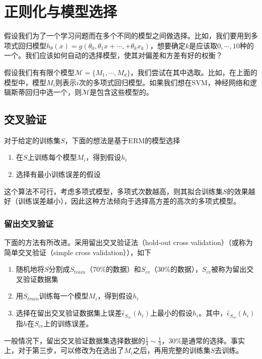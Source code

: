 \section{正则化与模型选择}
假设我们为了一个学习问题而在多个不同的模型之间做选择。比如，我们要用到多项式回归模型$h_\theta(x)=g(\theta_0,\theta_1x+\cdots,+\theta_kx_k)$，想要确定$k$是应该取$0,\cdots,10$种的一个。我们应该如何自动的选择模型，使其对偏差和方差有好的权衡？

假设我们有有限个模型$\mathcal{M}=\{M_1,\cdots,M_d\}$，我们尝试在其中选取。比如，在上面的模型中，模型$M_i$则表示$i$次的多项式回归模型。如果我们想在SVM，神经网络和逻辑斯蒂回归中选一个，则$\mathcal{M}$是包含这些模型的。

\subsection{交叉验证}
对于给定的训练集$S$，下面的想法是基于ERM的模型选择
\begin{enumerate}[1]
\item 在$S$上训练每个模型$M_i$，得到假设$h_i$
\item 选择有最小训练误差的假设
\end{enumerate}

这个算法不可行，考虑多项式模型，多项式次数越高，则其拟合训练集$S$的效果越好（训练误差越小），因此这种方法倾向于选择高方差的高次的多项式模型。
\subsubsection{留出交叉验证}
下面的方法有所改进。采用留出交叉验证法（hold-out cross validation）（或称为简单交叉验证（simple cross validation）），如下
\begin{enumerate}[1]
\item 随机地将$S$分割成$S_{train}$（$70\%$的数据）和$S_{cv}$（$30\%$的数据），$S_{cv}$被称为留出交叉验证数据集
\item 用$S_{train}$训练每一个模型$M_i$，得到假设$h_i$
\item 选择在留出交叉验证数据集上误差$\hat{\epsilon}_{S_{cv}}(h_i)$上最小的假设$h_i$。其中，$\hat{\epsilon}_{S_{cv}}(h_i)$指$h$在$S_{cv}$上的训练误差。
\end{enumerate}
一般情况下，留出交叉验证数据集选择数据的$\frac{1}{4}\sim\frac{1}{3}$，$30\%$是通常的选择。事实上，对于第三步，可以修改为在选出了$M_i$之后，再用完整的训练集$S$去训练。

